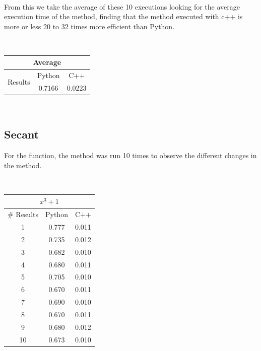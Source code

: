 \documentclass[conference]{IEEEtran}
\begin{document}
\


From this we take the average of these 10 executions looking for the average execution time of the method, finding that the method executed with c++ is more or less 20 to 32 times more efficient than Python.


\

\begin{tabular}{|c|c|c|}
\hline
\multicolumn{3}{|c|}{Average}              \\ \hline
\multirow{2}{*}{Results} & Python & C++    \\ \cline{2-3} 
                         & 0.7166 & 0.0223 \\ \hline
\end{tabular}




\  



\subsection{Secant}



For the function, the method was run 10 times to observe the different changes in the method.


\





\begin{tabular}{|c|c|c|}
\hline
\multicolumn{3}{|c|}{\(x^3 + 1\)} \\ \hline
\# Results               & Python              & C++                \\ \hline
1                        & 0.777               & 0.011              \\ \hline
2                        & 0.735               & 0.012              \\ \hline
3                        & 0.682               & 0.010              \\ \hline
4                        & 0.680               & 0.011              \\ \hline
5                        & 0.705               & 0.010              \\ \hline
6                        & 0.670               & 0.011              \\ \hline
7                        & 0.690               & 0.010              \\ \hline
8                        & 0.670               & 0.011              \\ \hline
9                        & 0.680               & 0.012              \\ \hline
10                       & 0.673               & 0.010              \\ \hline
\end{tabular}
\end{document}
